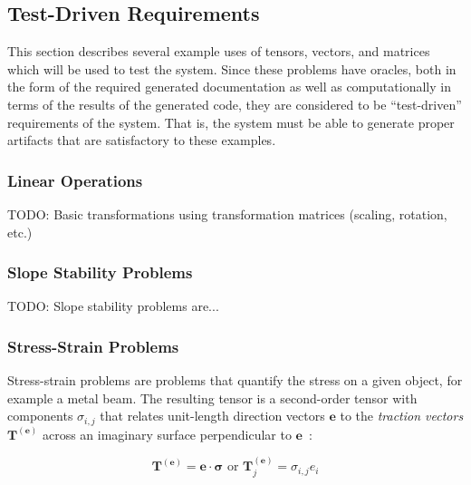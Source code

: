 \documentclass[12pt]{article}
\begin{document}
\subsection{Test-Driven Requirements}\label{Subsec:TDR}
This section describes several example uses of tensors, vectors,
and matrices which will be used to test the system. Since these problems
have oracles, both in the form of the required generated documentation as well as
computationally in terms of the results of the generated code, they are considered
to be ``test-driven'' requirements of the system. That is, the system must be
able to generate proper artifacts that are satisfactory to these examples. 

\subsubsection{Linear Operations}
TODO: Basic transformations using transformation matrices (scaling, rotation, etc.)

\subsubsection{Slope Stability Problems}
TODO: Slope stability problems are...

\subsubsection{Stress-Strain Problems}


Stress-strain problems are problems that quantify the stress on a given object,
for example a metal beam. The resulting tensor is a second-order tensor with components
$\sigma_{i,j}$ that relates unit-length direction vectors $\mathbf{e}$ to the
\textit{traction vectors} $\mathbf{T}^{(\mathbf{e})}$ across an imaginary surface
perpendicular to $\mathbf e$~\citep{Wikipedia_Cauchy_2025}:

$$\mathbf{T}^{(\mathbf{e})} = \mathbf e \cdot \mathbf \sigma\text{ or }\mathbf{T}^{(\mathbf{e})}_j = \sigma_{i,j}e_i$$ 
\end{document}
